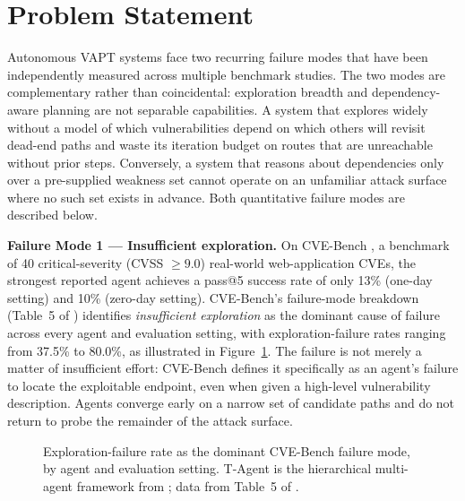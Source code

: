 \section{Problem Statement}
\label{sec:intro_problem}

Autonomous VAPT systems face two recurring failure modes that have been independently measured across multiple benchmark studies. The two modes are complementary rather than coincidental: exploration breadth and dependency-aware planning are not separable capabilities. A system that explores widely without a model of which vulnerabilities depend on which others will revisit dead-end paths and waste its iteration budget on routes that are unreachable without prior steps. Conversely, a system that reasons about dependencies only over a pre-supplied weakness set cannot operate on an unfamiliar attack surface where no such set exists in advance. Both quantitative failure modes are described below.

\textbf{Failure Mode 1 --- Insufficient exploration.} On CVE-Bench \citep{zhu2025cvebench}, a benchmark of 40 critical-severity (CVSS $\geq 9.0$) real-world web-application CVEs, the strongest reported agent achieves a pass@5 success rate of only 13\% (one-day setting) and 10\% (zero-day setting). CVE-Bench's failure-mode breakdown (Table~5 of \citealt{zhu2025cvebench}) identifies \emph{insufficient exploration} as the dominant cause of failure across every agent and evaluation setting, with exploration-failure rates ranging from 37.5\% to 80.0\%, as illustrated in Figure~\ref{fig:exploration-failure}. The failure is not merely a matter of insufficient effort: CVE-Bench defines it specifically as an agent's failure to locate the exploitable endpoint, even when given a high-level vulnerability description. Agents converge early on a narrow set of candidate paths and do not return to probe the remainder of the attack surface.

\begin{figure}[htbp]
	\centering
	\caption{Exploration-failure rate as the dominant CVE-Bench failure mode, by agent and evaluation setting. T-Agent is the hierarchical multi-agent framework from \citet{zhu2024hptsa}; data from Table~5 of \citet{zhu2025cvebench}.}
	\label{fig:exploration-failure}
\end{figure}

